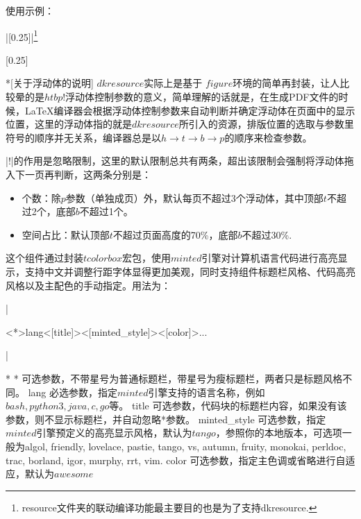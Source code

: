 使用示例：

|[0.25]|\footnote{resource文件夹的联动编译功能最主要目的也是为了支持dkresource.}

[0.25]

\begin{dkcomment}*[关于浮动体的说明]
  \hspace{2em}$dkresource$实际上是基于{\LaTeXe} $figure$环境的简单再封装，让人比较晕的是$htbp!$浮动体控制参数的意义，简单理解的话就是，在生成PDF文件的时候，{\LaTeX}编译器会根据浮动体控制参数来自动判断并确定浮动体在页面中的显示位置，这里的浮动体指的就是$dkresource$所引入的资源，排版位置的选取与参数里符号的顺序并无关系，编译器总是以$h \to t \to b \to p$的顺序来检查参数。

  \hspace{2em}|!|的作用是忽略限制，这里的默认限制总共有两条，超出该限制会强制将浮动体拖入下一页再判断，这两条分别是：

  \begin{itemize}
    \item 个数：除$p$参数（单独成页）外，默认每页不超过3个浮动体，其中顶部$t$不超过2个，底部$b$不超过1个。
    \item 空间占比：默认顶部$t$不超过页面高度的70\%，底部$b$不超过30\%.
  \end{itemize}
\end{dkcomment}

这个组件通过封装$tcolorbox$宏包，使用$minted$引擎对计算机语言代码进行高亮显示，支持中文并调整行距字体显得更加美观，同时支持组件标题栏风格、代码高亮风格以及主配色的手动指定。用法为：

|\begin{dkcode}<*>{lang}<[title]><[minted_style]><[color]>...\end{dkcode}|

\begin{cvskills}*
  \cvskill
  {*}
  {可选参数，不带星号为普通标题栏，带星号为瘦标题栏，两者只是标题风格不同。}
  \cvskill
  {lang}
  {必选参数，指定$minted$引擎支持的语言名称，例如$bash, python3, java, c, go$等。}
  \cvskill
  {title}
  {可选参数，代码块的标题栏内容，如果没有该参数，则不显示标题栏，并自动忽略*参数。}
  \cvskill
  {minted\_style}
  {可选参数，指定$minted$引擎预定义的高亮显示风格，默认为$tango$，参照你的本地版本，可选项一般为algol, friendly, lovelace, pastie, tango, vs, autumn, fruity, monokai, perldoc, trac, borland, igor, murphy, rrt, vim.}
  \cvskill
  {color}
  {可选参数，指定主色调或省略进行自适应，默认为$awesome$}
\end{cvskills}

